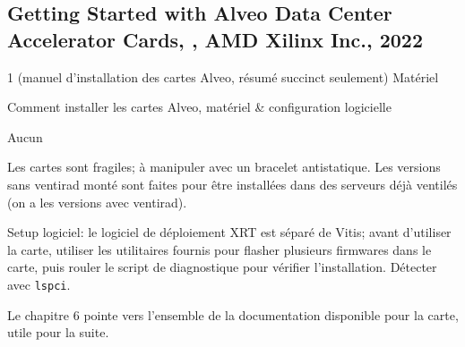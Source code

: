 
\subsection{Getting Started with Alveo Data Center Accelerator Cards, \cite{amd_xilinx_inc_introduction_2022}, AMD Xilinx Inc., 2022}
 1 (manuel d'installation des cartes Alveo, résumé succinct seulement)
 Matériel

 Comment installer les cartes Alveo, matériel \& configuration logicielle

 Aucun

 Les cartes sont fragiles; à manipuler avec un bracelet antistatique. Les versions sans ventirad monté sont faites pour être installées dans des serveurs déjà ventilés (on a les versions avec ventirad).

Setup logiciel: le logiciel de déploiement XRT est séparé de Vitis; avant d'utiliser la carte, utiliser les utilitaires fournis pour flasher plusieurs firmwares dans le carte, puis rouler le script de diagnostique pour vérifier l'installation. Détecter avec \texttt{lspci}.

Le chapitre 6 pointe vers l'ensemble de la documentation disponible pour la carte, utile pour la suite.

\clearpage
